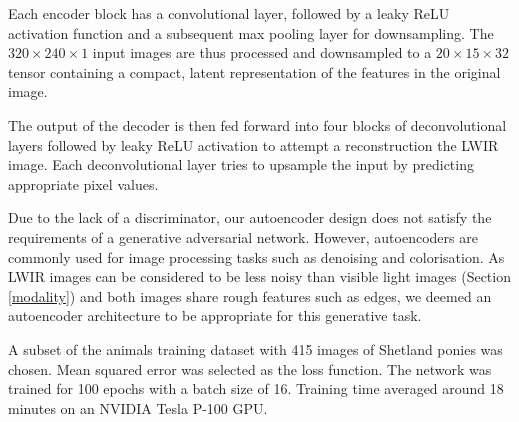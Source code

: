 \documentclass{l4proj}
\begin{document}
Each encoder block has a convolutional layer, followed by a leaky ReLU activation function and a subsequent max pooling layer for downsampling. The $320 \times 240 \times 1$ input images are thus processed and downsampled to a $20 \times 15 \times 32$ tensor containing a compact, latent representation of the features in the original image.

The output of the decoder is then fed forward into four blocks of deconvolutional layers followed by leaky ReLU activation to attempt a reconstruction the LWIR image. Each deconvolutional layer tries to upsample the input by predicting appropriate pixel values.

Due to the lack of a discriminator, our autoencoder design does not satisfy the requirements of a generative adversarial network. However, autoencoders are commonly used for image processing tasks such as denoising and colorisation. As LWIR images can be considered to be less noisy than visible light images (Section \ref{modality}) and both images share rough features such as edges, we deemed an autoencoder architecture to be appropriate for this generative task.

A subset of the animals training dataset with 415 images of Shetland ponies was chosen. Mean squared error was selected as the loss function. The network was trained for 100 epochs with a batch size of 16. Training time averaged around 18 minutes on an NVIDIA Tesla P-100 GPU.
\end{document}

